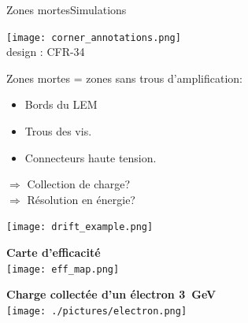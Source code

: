     \begin{frame}{Zones mortes}{Simulations}
       	\begin{scriptsize}
       		\begin{minipage}{0.38\textwidth}
       			\begin{center}
       				\texttt{[image: corner\_annotations.png]}\\
       				design : CFR-34\\
       			\end{center} 
       			Zones mortes = zones sans trous d'amplification:
       			\begin{itemize}
       				\item Bords du LEM
       				\item Trous des vis.
       				\item Connecteurs haute tension.
       			\end{itemize}
       			$\Rightarrow$ Collection de charge?\\
       			$\Rightarrow$ Résolution en énergie?\\
       		\end{minipage}
       		\begin{minipage}{0.58\textwidth}
       			\centering
       			\texttt{[image: drift\_example.png]}\\
       			\vspace{0.5cm} \hspace{0.1cm}
       			\begin{minipage}{0.48\textwidth}
       				\centering
       				\textbf{Carte d'efficacité}\\
       				\texttt{[image: eff\_map.png]}
       			\end{minipage}\hfill
       			\begin{minipage}{0.48\textwidth}
       				\centering
       				\textbf{Charge collectée d'un électron \SI{3}{\giga\eV}}\\
       				\texttt{[image: ./pictures/electron.png]}
       			\end{minipage}
       		\end{minipage}
       	\end{scriptsize} 
    \end{frame}

